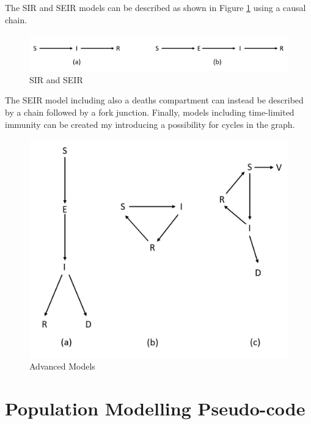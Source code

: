 \begin{appendices}
The SIR and SEIR models can be described as shown in Figure \ref{cd11} using a causal chain.

\begin{figure}[ht!]%
    \centering
    \includegraphics[width=0.9\linewidth]{latex/images/caus_eq.pdf}
    \caption{SIR and SEIR}
    \label{cd11}
\end{figure}

The SEIR model including also a deaths compartment can instead be described by a chain followed by a fork junction. Finally, models including time-limited immunity can be created my introducing a possibility for cycles in the graph.

\begin{figure}[ht!]%
    \centering
    \includegraphics[width=0.6\linewidth]{latex/images/caus_eq2.pdf}
    \caption{Advanced Models}
    \label{cd12}
\end{figure}

\clearpage

\section{Population Modelling Pseudo-code}
\label{code_alg}


\end{appendices}
